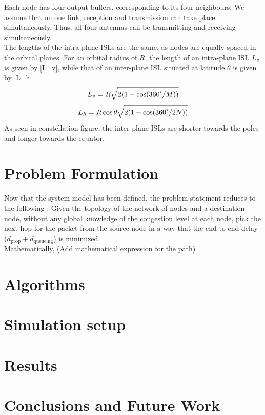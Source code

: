 \documentclass[10pt,conference, draft, letterpaper]{IEEEtran}
\newcommand{\rough}[1]{{\color{red} #1}}
\begin{document}
Each node has four output buffers, corresponding to its four neighbours. We assume that on one link, reception and transmission can take place simultaneously. Thus, all four antennas can be transmitting and receiving simultaneously.\\
The lengths of the intra-plane ISLs are the same, as nodes are equally spaced in the orbital planes. For an orbital radius of $R$, the length of an intra-plane ISL $L_v$ is given by \ref{L_v}, while that of an inter-plane ISL situated at latitude $\theta$ is given by \ref{L_h}
\begin{equation}
\label{L_v}
	L_v = R\sqrt{2(1-\cos(360^\degree/M))}
\end{equation}
\begin{equation}
	\label{L_h}
	L_h = R\cos{\theta}\sqrt{2(1-\cos(360^\degree/2N))}
\end{equation}
As seen in \rough{constellation figure}, the inter-plane ISLs are shorter towards the poles and longer towards the equator.
\section{Problem Formulation}
Now that the system model has been defined, the problem statement reduces to the following : Given the topology of the network of nodes and a destination node, without any global knowledge of the congestion level at each node, pick the next hop for the packet from the source node in a way that the end-to-end delay ($d_{\text{prop}}+d_{\text{queueing}}$) is minimized.\\
Mathematically, \rough{(Add mathematical expression for the path)}
\section{Algorithms}
\section{Simulation setup}
\section{Results}
\section{Conclusions and Future Work}


\end{document}
